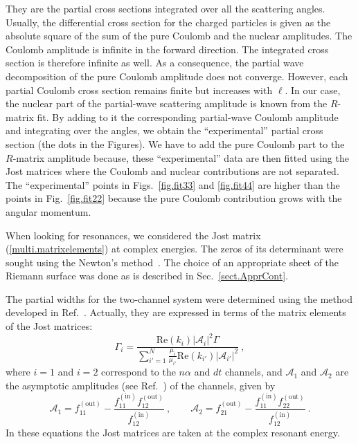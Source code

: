 \documentclass[12pt]{article}
\begin{document}
They are the partial cross sections integrated over all the scattering angles. 
Usually, the differential cross section for the charged particles is given as 
the absolute square of the sum of the pure Coulomb and the nuclear amplitudes.
The Coulomb amplitude is infinite in the forward direction. The integrated 
cross section is therefore infinite as well. As a consequence, the partial wave
decomposition of the pure Coulomb amplitude does not converge. However, each 
partial Coulomb cross section remains finite but increases with $\ell$. In our 
case, the nuclear part of the partial-wave scattering amplitude is known from 
the $R$-matrix fit. By adding to it the corresponding partial-wave Coulomb 
amplitude and integrating over the angles, we obtain the ``experimental'' 
partial cross section (the dots in the Figures). We have to add the pure 
Coulomb part to the $R$-matrix amplitude because, these ``experimental'' data 
are then fitted using the Jost matrices where the Coulomb and nuclear 
contributions are not separated. The ``experimental'' points in 
Figs.~\ref{fig.fit33} and \ref{fig.fit44} are higher than the points in 
Fig.~\ref{fig.fit22} because the pure Coulomb contribution grows with the 
angular momentum.

When looking for resonances, we considered the Jost matrix
(\ref{multi.matrixelements}) at complex energies. The zeros of its determinant
were sought using the Newton's method~\cite{Press}.
The choice of an appropriate sheet of the Riemann surface was
done as is described in Sec.~\ref{sect.ApprCont}.

The partial widths for the two-channel system were determined using the method
developed in Ref.~\cite{my.partial}. Actually, they are expressed in terms of
the matrix elements of the Jost matrices:
\begin{equation}
\label{Gpartial}
   \Gamma_i=
   \displaystyle\frac{\mathrm{Re}(k_i)|\mathcal{A}_i|^2\Gamma}
   {\displaystyle\sum_{i'=1}^N\frac{\mu_i}{\mu_{i'}}
   \mathrm{Re}(k_{i'})|\mathcal{A}_{i'}|^2}\ ,
\end{equation}
where $i=1$ and $i=2$ correspond to the $n\alpha$ and $dt$ channels, and
$\mathcal{A}_1$ and $\mathcal{A}_2$ are  the asymptotic amplitudes
(see Ref.~\cite{my.partial}) of the channels, given by
\begin{equation}
\label{A_1A_2_Final}
   \mathcal{A}_1=f^{(\mathrm{out})}_{11}-\displaystyle
   \frac{f^{(\mathrm{in})}_{11}f^{(\mathrm{out})}_{12}}{f^{(\mathrm{in})}_{12}}
   \ ,\qquad
   \mathcal{A}_2=f^{(\mathrm{out})}_{21}-\displaystyle
   \frac{f^{(\mathrm{in})}_{11}f^{(\mathrm{out})}_{22}}{f^{(\mathrm{in})}_{12}}
   \ .
\end{equation}
In these equations the Jost matrices are taken at the complex resonant energy.
\end{document}
